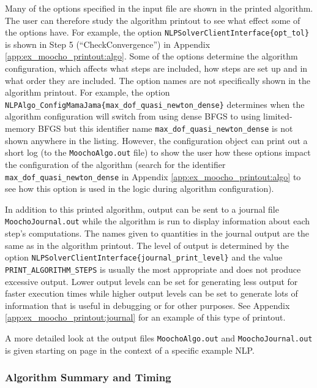 \documentclass[pdf,ps2pdf,11pt]{SANDreport}
\begin{document}
Many of the options specified in the input file are shown in the printed
algorithm.  The user can therefore study the algorithm printout to see what
effect some of the options have.  For example, the option
{}\texttt{NLP\-Solver\-Client\-Interface\{\-opt\_tol\-\}} is shown in Step 5
(``CheckConvergence'') in Appendix {}\ref{app:ex_moocho_printout:algo}.  Some
of the options determine the algorithm configuration, which affects what steps
are included, how steps are set up and in what order they are included.  The
option names are not specifically shown in the algorithm printout.  For
example, the option
{}\texttt{NLPAlgo\-\_Config\-MamaJama\{\-max\-\_dof\-\_quasi\-\_newton\-\_dense\-\}}
determines when the algorithm configuration will switch from using dense BFGS
to using limited-memory BFGS but this identifier name
{}\texttt{max\-\_dof\-\_quasi\-\_newton\-\_dense} is not shown anywhere in the
listing.  However, the configuration object can print out a short log (to the
{}\texttt{MoochoAlgo.out} file) to show the user how these options impact the
configuration of the algorithm (search for the identifier
{}\texttt{max\-\_dof\-\_quasi\-\_newton\-\_dense} in Appendix
{}\ref{app:ex_moocho_printout:algo} to see how this option is used in the
logic during algorithm configuration).

In addition to this printed algorithm, output can be sent to a journal file
{}\texttt{Moocho\-Journal.out} while the algorithm is run to display
information about each step's computations.  The names given to quantities in
the journal output are the same as in the algorithm printout.  The level of
output is determined by the option
{}\texttt{NLP\-Solver\-Client\-Interface\{\-journal\-\_print\-\_level\-\}}
and the value {}\texttt{PRINT\-\_ALGORITHM\-\_STEPS} is usually the most
appropriate and does not produce excessive output.  Lower output levels can be
set for generating less output for faster execution times while higher output
levels can be set to generate lots of information that is useful in debugging
or for other purposes.  See Appendix {}\ref{app:ex_moocho_printout:journal}
for an example of this type of printout.

A more detailed look at the output files {}\texttt{Moocho\-Algo.out} and
{}\texttt{Moocho\-Journal.out} is given starting on page
{}\pageref{moocho:sec:detailed_example} in the context of a specific
example NLP.

%
\subsubsection{Algorithm Summary and Timing}
%
\end{document}

